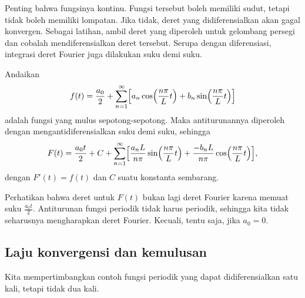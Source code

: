 Penting bahwa fungsinya kontinu.  Fungsi tersebut boleh memiliki sudut, tetapi tidak boleh memiliki
lompatan.  Jika tidak, deret yang didiferensialkan akan gagal konvergen.  Sebagai
latihan, ambil deret yang diperoleh untuk gelombang persegi dan cobalah
mendiferensialkan deret tersebut.
Serupa dengan diferensiasi,
integrasi deret Fourier juga dilakukan suku demi suku.

\begin{theorem}
Andaikan
\begin{equation*}
f(t) = \frac{a_0}{2} + \sum_{n=1}^\infty
\Bigl[
a_n \cos \Bigl( \frac{n \pi}{L} t \Bigr)
+ b_n \sin \Bigl( \frac{n \pi}{L} t \Bigr)
\Bigr]
\end{equation*}
adalah fungsi yang mulus sepotong-sepotong.  Maka antiturunannya
diperoleh dengan mengantidiferensialkan suku demi suku, sehingga
\begin{equation*}
F(t) = \frac{a_0 t}{2} + C + \sum_{n=1}^\infty
\Bigl[
\frac{a_n L}{n \pi} \sin \Bigl( \frac{n \pi}{L} t \Bigr)
+ \frac{-b_n L}{n \pi}  \cos \Bigl( \frac{n \pi}{L} t \Bigr)
\Bigr] ,
\end{equation*}
dengan $F'(t) = f(t)$ dan $C$ suatu konstanta sembarang.
\end{theorem}

Perhatikan bahwa deret untuk $F(t)$ bukan lagi deret Fourier karena memuat
suku $\frac{a_0 t}{2}$.  Antiturunan
fungsi periodik tidak harus periodik, sehingga kita tidak seharusnya
mengharapkan deret Fourier.  Kecuali, tentu saja, jika $a_0 = 0$.

\subsection{Laju konvergensi dan kemulusan}

Kita mempertimbangkan contoh fungsi periodik yang dapat didiferensialkan satu kali, tetapi tidak
dua kali.

